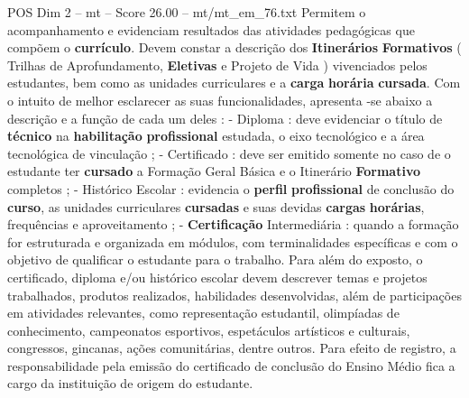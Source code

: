 \begin{textsample}{POS Dim 2 – mt – Score 26.00 – mt/mt\_em\_76.txt}
Permitem o acompanhamento e evidenciam resultados das atividades pedagógicas que compõem o \textbf{currículo}.
Devem constar a descrição dos \textbf{Itinerários} \textbf{Formativos} ( Trilhas de Aprofundamento, \textbf{Eletivas} e Projeto de Vida ) vivenciados pelos estudantes, bem como as unidades curriculares e a \textbf{carga} \textbf{horária} \textbf{cursada}.
Com o intuito de melhor esclarecer as suas funcionalidades, apresenta -se abaixo a descrição e a função de cada um deles : - Diploma : deve evidenciar o título de \textbf{técnico} na \textbf{habilitação} \textbf{profissional} estudada, o eixo tecnológico e a área tecnológica de vinculação ; - Certificado : deve ser emitido somente no caso de o estudante ter \textbf{cursado} a Formação Geral Básica e o Itinerário \textbf{Formativo} completos ; - Histórico Escolar : evidencia o \textbf{perfil} \textbf{profissional} de conclusão do \textbf{curso}, as unidades curriculares \textbf{cursadas} e suas devidas \textbf{cargas} \textbf{horárias}, frequências e aproveitamento ; - \textbf{Certificação} Intermediária : quando a formação for estruturada e organizada em módulos, com terminalidades específicas e com o objetivo de qualificar o estudante para o trabalho.
Para além do exposto, o certificado, diploma e/ou histórico escolar devem descrever temas e projetos trabalhados, produtos realizados, habilidades desenvolvidas, além de participações em atividades relevantes, como representação estudantil, olimpíadas de conhecimento, campeonatos esportivos, espetáculos artísticos e culturais, congressos, gincanas, ações comunitárias, dentre outros.
Para efeito de registro, a responsabilidade pela emissão do certificado de conclusão do Ensino Médio fica a cargo da instituição de origem do estudante.

\end{textsample}
